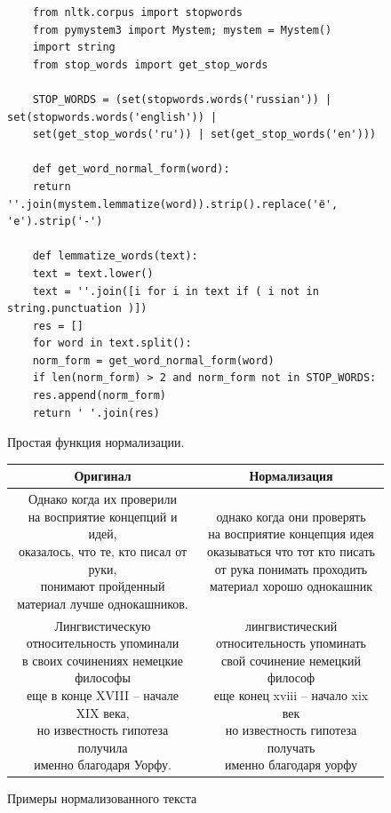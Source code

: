 \documentclass[a4paper, 14pt]{extarticle}
\begin{document}
\begin{figure}
	\centering
	\begin{verbatim}
	from nltk.corpus import stopwords
	from pymystem3 import Mystem; mystem = Mystem()
	import string
	from stop_words import get_stop_words
	
	STOP_WORDS = (set(stopwords.words('russian')) | set(stopwords.words('english')) | 
	set(get_stop_words('ru')) | set(get_stop_words('en')))
	
	def get_word_normal_form(word):
	return ''.join(mystem.lemmatize(word)).strip().replace('ё', 'е').strip('-')
	
	def lemmatize_words(text):
	text = text.lower()
	text = ''.join([i for i in text if ( i not in string.punctuation )])
	res = []
	for word in text.split():
	norm_form = get_word_normal_form(word)
	if len(norm_form) > 2 and norm_form not in STOP_WORDS:
	res.append(norm_form)
	return ' '.join(res)
	\end{verbatim}
	\caption{Простая функция нормализации.}
	\label{norm}
\end{figure}


\begin{figure}
	\centering
	{ %
		\begin{tabular}{|c|c|}
			\hline
			Оригинал  & Нормализация \\ \hline\hline
			\makecell{Однако когда их проверили\\ на восприятие концепций и идей,\\ оказалось, что те, кто писал от руки,\\ понимают пройденный \\материал лучше однокашников.} & \makecell{однако когда они проверять\\ на восприятие концепция идея\\ оказываться что тот кто писать\\ от рука понимать проходить\\ материал хорошо однокашник}
			\\ \hline
			\makecell{Лингвистическую относительность упоминали\\ в своих сочинениях немецкие философы\\ еще в конце XVIII – начале XIX века, \\но известность гипотеза получила\\ именно благодаря Уорфу.} & \makecell{лингвистический относительность упоминать \\свой сочинение немецкий философ \\еще конец xviii – начало xix век \\но известность гипотеза получать\\ именно благодаря уорфу} \\ \hline
		\end{tabular}
	}
	\caption{Примеры нормализованного текста}
	\label{exa}
\end{figure}
\end{document}
